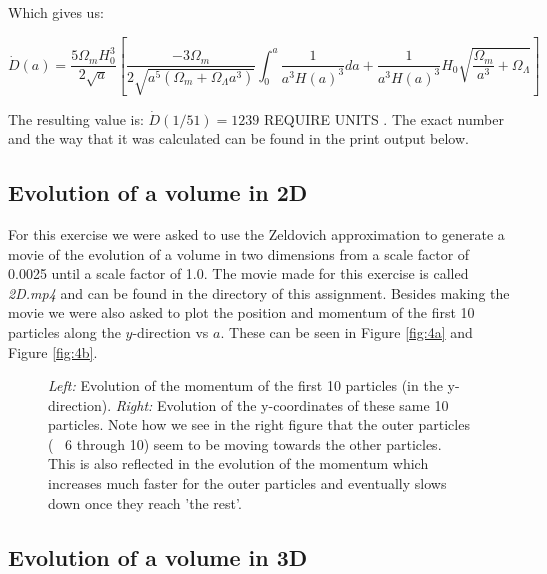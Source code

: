 \documentclass[a4paper,10pt]{article}
\begin{document}
Which gives us: 

\begin{equation}
\dot{D}(a) = \frac{5\Omega_mH_0^3}{2\sqrt{a}}[\frac{-3\Omega_m}{2\sqrt{a^5(\Omega_m+\Omega_\Lambda a^3)}}\int^a_0\frac{1}{a^3H(a)^3}da+\frac{1}{a^3H(a)^3}H_0\sqrt{\frac{\Omega_m}{a^3}+\Omega_\Lambda}]
\end{equation}

The resulting value is: $\dot{D}(1/51) = 1239$ REQUIRE UNITS . The exact number and the way that it was calculated can be found in the print output below. 

\subsection{Evolution of a volume in 2D}

For this exercise we were asked to use the Zeldovich approximation to generate a movie of the evolution of a volume in two dimensions from a scale factor of 0.0025 until a scale factor of 1.0. The movie made for this exercise is called \textit{2D.mp4} and can be found in the directory of this assignment. Besides making the movie we were also asked to plot the position and momentum of the first 10 particles along the $y$-direction vs $a$. These can be seen in Figure \ref{fig:4a} and Figure \ref{fig:4b}. 

\begin{figure}[h!] 
	\begin{center}
	\end{center}
	\captionsetup{width=0.8\linewidth}
	\vspace*{-7mm} %
	\caption{\textit{Left:} Evolution of the momentum of the first 10 particles (in the y-direction).  \textit{Right:} Evolution of the y-coordinates of these same 10 particles. Note how we see in the right figure that the outer particles (~ 6 through 10) seem to be moving towards the other particles. This is also reflected in the evolution of the momentum which increases much faster for the outer particles and eventually slows down once they reach 'the rest'.}
	\label{fig:4ab}
\end{figure}

\subsection{Evolution of a volume in 3D}
\end{document}
